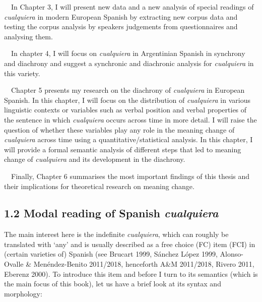 \begin{styleStandard}
\ \ In Chapter 3, I will present new data and a new analysis of special readings of \textit{cualquiera} in modern European Spanish by extracting new corpus data and testing the corpus analysis by speakers judgements from questionnaires and analysing them.
\end{styleStandard}

\begin{styleStandard}
\ \ In chapter 4, I will focus on \textit{cualquiera} in Argentinian Spanish in synchrony and diachrony and suggest a synchronic and diachronic analysis for \textit{cualquiera} in this variety. 
\end{styleStandard}

\begin{styleStandard}
\ \ Chapter 5 presents my research on the diachrony of \textit{cualquiera }in European Spanish. In this chapter, I will focus on the distribution of \textit{cualquiera} in various linguistic contexts or variables such as verbal position and verbal properties of the sentence in which \textit{cualquiera} occurs across time in more detail. I will raise the question of whether these variables play any role in the meaning change of \textit{cualquiera} across time using a quantitative/statistical analysis. In this chapter, I will provide a formal semantic analysis of different steps that led to meaning change of \textit{cualquiera} and its development in the diachrony.
\end{styleStandard}

\begin{styleStandard}
\ \ Finally, Chapter 6 summarises the most important findings of this thesis and their implications for theoretical research on meaning change.
\end{styleStandard}

\subsection[1.2 Modal reading of Spanish cualquiera]{1.2 Modal reading of Spanish \textit{cualquiera}}
\begin{styleStandard}
The main interest here is the indefinite \textit{cualquiera}, which can roughly be translated with ‘any’ and is usually described as a free choice (FC) item (FCI) in (certain varieties of) Spanish (see Brucart 1999, Sánchez López 1999, Alonso-Ovalle \& Menéndez-Benito 2011/2018, henceforth A\&M 2011/2018, Rivero 2011, Eberenz 2000). To introduce this item and before I turn to its semantics (which is the main focus of this book), let us have a brief look at its syntax and morphology:
\end{styleStandard}

